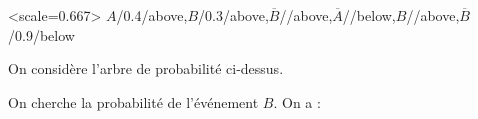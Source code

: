 
\hfill\ArbreProbasTikz%
  <scale=0.667>%
  {$A$/\num{0.4}/above,$B$/\num{0.3}/above,$\overline{B}$//above,$\overline{A}$//below,$B$//above,$\overline{B}$/\num{0.9}/below}%
\hfill\null

\smallskip

On considère l'arbre de probabilité ci-dessus.

On cherche la probabilité de l'événement $B$. On a :

\smallskip

